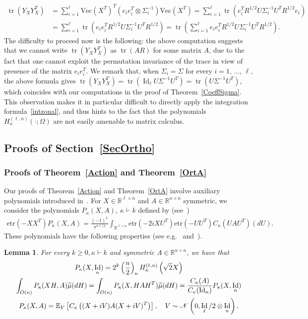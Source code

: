 \documentclass[10pt]{amsart}
\newtheorem{lemm}[theo]{Lemma}\newtheorem{prop}[theo]{Proposition}\newtheorem{coro}[theo]{Corollary}\newtheorem{conj}[theo]{Conjecture}
\theoremstyle{definition}\newtheorem{defi}[theo]{Definition}\newtheorem{rema}[theo]{Remark}\newtheorem{exam}[theo]{Example}\newtheorem{exem}[theo]{Example}\newtheorem{nota}[theo]{Notation}
\DeclareMathOperator{\Id}{Id}
\DeclareMathOperator{\Tr}{tr}
\newcommand{\scN}{\mathscr{N}}
\renewcommand{\Vec}{\mathrm{Vec}}
\newcommand{\R}{\mathbb{R}}
\newcommand{\EX}[2]{\mathbb{E}_{#1}\left[#2\right]}
\newcommand{\etr}[1]{\mathrm{etr}\left(#1\right)}
\let\oldtilde\tilde
\renewcommand*{\tilde}[1]{\mathchoice{\widetilde{#1}}{\widetilde{#1}}{\oldtilde{#1}}{\oldtilde{#1}}}
\begin{document}
\begin{align*}
\Tr(Y_XY_X^T) &= \sum_{i=1}^{\ell}\Vec\left(X^T\right)^T \left(e_ie_i^T \otimes \Sigma_i^{-1}\right) \Vec(X^T) = \sum_{i=1}^{\ell} \Tr\left(e_i^T R^{1/2} U \Sigma^{-1}_i U^T R^{1/2} e_i
\right) \\
&= \sum_{i=1}^{\ell} \Tr\left(e_ie_i^T R^{1/2} U \Sigma^{-1}_i U^T R^{1/2} \right) = \Tr\left(\sum_{i=1}^{\ell}e_ie_i^T R^{1/2} U \Sigma^{-1}_i U^T R^{1/2}\right).
\end{align*}
The difficulty to proceed now is the following: the above computation suggests that we cannot write $\Tr(Y_XY_X^T)$ as $\Tr(AR)$ for some matrix $A$, due to the fact that one cannot exploit the permutation invariance of the trace in view of presence of the matrix $e_i e_i^T$. We remark that, when $\Sigma_i=\Sigma$ for every $i=1,\,\ldots,\,\ell$, the above formula gives $\Tr(Y_XY_X^T)= \Tr(\Id_{\ell}U\Sigma^{-1}U^T)=\Tr(U\Sigma^{-1}U^T) $, which coincides with our computations in the proof of Theorem~\ref{CoeffSigma}. This observation makes it in particular difficult to directly apply the integration formula~\eqref{intzonal}, and thus hints to the fact that the polynomials $H_{\kappa}^{(\ell,n)}(\cdot;\Omega)$ are not easily amenable to matrix calculus.

\subsection{Proofs of Section~\ref{SecOrtho}}



\subsubsection*{Proofs of Theorem~\ref{Action} and Theorem~\ref{OrtA}}
Our proofs of Theorem~\ref{Action} and Theorem~\ref{OrtA} involve auxiliary polynomials introduced in~\cite{Hay}. For $X \in \R^{\ell \times n}$ and $ A \in \R^{n\times n}$ symmetric, we consider the polynomials $P_{\kappa}(X,A), \ \kappa \vdash k$ defined by (see~\cite[Eq.~(34)]{Hay})
\begin{gather*}
\etr{-XX^T}P_{\kappa}(X,A)=\frac{(-1)^k}{\pi^{n\ell/2}} \int_{\R^{\ell\times n}} \etr{-2iXU^T}\etr{-UU^T}C_{\kappa}\left(UAU^T\right) (dU).
\end{gather*}
These polynomials have the following properties (see e.g.~\cite[p.~229]{BFZP} and~\cite[Section~6]{Hay}).

\begin{lemm}
For every $k\geq 0, \kappa \vdash k$ and symmetric $A\in \R^{n\times n}$, we have that
\begin{gather}
P_{\kappa}(X,\Id_n) = 2^k\left(\frac{n}{2}\right)_{\kappa} H_{\kappa}^{(\ell,n)}\left(\sqrt{2}X\right) \label{P1}
\\
\int_{O(n)} P_{\kappa}(XH,A) \tilde{\mu}(dH) = \int_{O(n)} P_{\kappa}(X,HAH^T) \tilde{\mu}(dH) = \frac{C_{\kappa}(A)}{C_{\kappa}(\Id_n)} P_{\kappa}(X,\Id_n) \label{P2}
\\
P_{\kappa}(X,A) = \EX{V}{C_{\kappa}\left((X+iV)A(X+iV)^T\right)}, \quad V \sim \scN\left(0,\Id_{\ell}/2\otimes\Id_n\right). \label{P3}
\end{gather}
\end{lemm}
\end{document}
